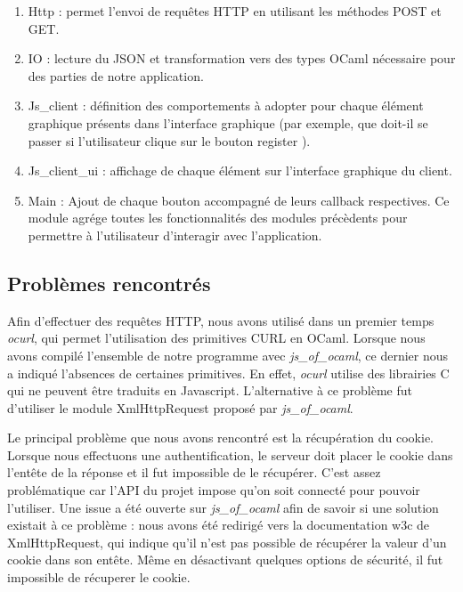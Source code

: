 \documentclass[12pt,a4paper]{report}
\begin{document}
\begin{enumerate}
\item Http : permet l'envoi de requêtes HTTP en utilisant les méthodes POST et
  GET.
\item IO : lecture du JSON et transformation vers des types OCaml nécessaire
  pour des parties de notre application.
\item Js\_client : définition des comportements à adopter pour chaque élément
  graphique présents dans l'interface graphique (par exemple, que doit-il se
  passer si l'utilisateur clique sur le bouton \og{} register \fg{}).
\item Js\_client\_ui : affichage de chaque élément sur l'interface graphique
  du client.
\item Main : Ajout de chaque bouton accompagné de leurs callback respectives.
  Ce module agrége toutes les fonctionnalités des modules précèdents pour
  permettre à l'utilisateur d'interagir avec l'application.
\end{enumerate}

\subsection{Problèmes rencontrés}

Afin d'effectuer des requêtes HTTP, nous avons utilisé dans un premier temps
\emph{ocurl}, qui permet l'utilisation des primitives CURL en OCaml. Lorsque
nous avons compilé l'ensemble de notre programme avec \emph{js\_of\_ocaml},
ce dernier nous a indiqué l'absences de certaines primitives. En effet,
\emph{ocurl} utilise des librairies C qui ne peuvent être traduits en
Javascript. L'alternative à ce problème fut d'utiliser le module
XmlHttpRequest proposé par \emph{js\_of\_ocaml}.\newline

Le principal problème que nous avons rencontré est la récupération du cookie.
Lorsque nous effectuons une authentification, le serveur doit placer le cookie
dans l'entête de la réponse et il fut impossible de le récupérer. C'est assez
problématique car l'API du projet impose qu'on soit connecté pour pouvoir
l'utiliser. Une issue a été ouverte sur \emph{js\_of\_ocaml} afin de savoir
si une solution existait à ce problème : nous avons été redirigé vers la
documentation w3c de XmlHttpRequest, qui indique qu'il n'est pas possible de
récupérer la valeur d'un cookie dans son entête. Même en désactivant
quelques options de sécurité, il fut impossible de récuperer le cookie. \newline
\end{document}
